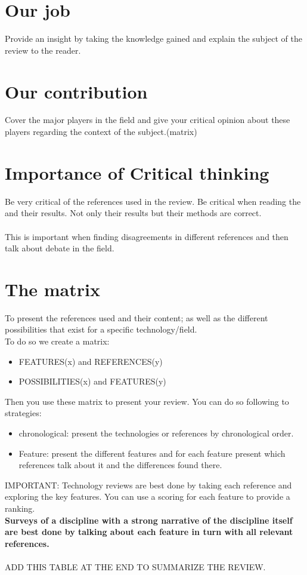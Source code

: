 \documentclass[9pt]{article}
\begin{document}
\section{Our job}
Provide an insight by taking the knowledge gained and explain the subject of the review to the reader.

\section{Our contribution}
Cover the major players in the field and give your critical opinion about these players regarding the context of the subject.(matrix)

\section{Importance of Critical thinking}
Be very critical of the references used in the review. Be critical when reading the and their results. Not only their results but their methods are correct.\\\\
This is important when finding disagreements in different references and then talk about debate in the field.
\section{The matrix}
To present the references used and their content; as well as the different possibilities that exist for a specific technology/field. \\ To do so we create a matrix:
\begin{itemize}
\item FEATURES(x) and REFERENCES(y)
\item POSSIBILITIES(x) and FEATURES(y)
\end{itemize}
Then you use these matrix to present your review. You can do so following to strategies:
\begin{itemize}
\item chronological: present the technologies or references by chronological order.
\item Feature: present the different features and for each feature present which references talk about it and the differences found there.
\end{itemize}
IMPORTANT: 
Technology reviews are best done by taking each reference and exploring the key features. You can use a scoring for each feature to provide a ranking.\\
\textbf{Surveys of a discipline with a strong narrative of the discipline itself are best done by talking about each feature in turn with all relevant references.}\\\\
ADD THIS TABLE AT THE END TO SUMMARIZE THE REVIEW.
\end{document}
